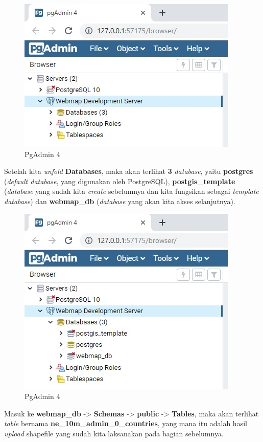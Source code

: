 \documentclass[]{book}
\begin{document}
\begin{figure}
\centering
\includegraphics{./img/pgadmin4-connection-collapsed.jpg}
\caption{PgAdmin 4}
\end{figure}

Setelah kita \emph{unfold} \textbf{Databases}, maka akan terlihat \textbf{3} \emph{database}, yaitu \textbf{postgres} (\emph{default database}, yang digunakan oleh PostgreSQL), \textbf{postgis\_template} (\emph{database} yang sudah kita \emph{create} sebelumnya dan kita fungsikan sebagai \emph{template database}) dan \textbf{webmap\_db} (\emph{database} yang akan kita akses selanjutnya).

\begin{figure}
\centering
\includegraphics{./img/pgadmin4-collapsed-show-db.jpg}
\caption{PgAdmin 4}
\end{figure}

Masuk ke \textbf{webmap\_db} -\textgreater{} \textbf{Schemas} -\textgreater{} \textbf{public} -\textgreater{} \textbf{Tables}, maka akan terlihat \emph{table} bernama \textbf{ne\_10m\_admin\_0\_countries}, yang mana itu adalah hasil \emph{upload} shapefile yang sudah kita laksanakan pada bagian sebelumnya.
\end{document}

